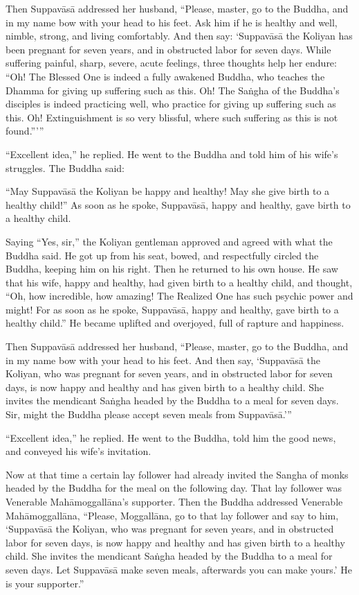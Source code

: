 \documentclass[12pt,openany]{book}%
\begin{document}
Then \textsanskrit{Suppavāsā} addressed her husband, “Please, master, go to the Buddha, and in my name bow with your head to his feet. Ask him if he is healthy and well, nimble, strong, and living comfortably. And then say: ‘\textsanskrit{Suppavāsā} the Koliyan has been pregnant for seven years, and in obstructed labor for seven days. While suffering painful, sharp, severe, acute feelings, three thoughts help her endure: “Oh! The Blessed One is indeed a fully awakened Buddha, who teaches the Dhamma for giving up suffering such as this. Oh! The \textsanskrit{Saṅgha} of the Buddha’s disciples is indeed practicing well, who practice for giving up suffering such as this. Oh! Extinguishment is so very blissful, where such suffering as this is not found.”’” 

“Excellent idea,” he replied. He went to the Buddha and told him of his wife’s struggles. The Buddha said: 

“May \textsanskrit{Suppavāsā} the Koliyan be happy and healthy! May she give birth to a healthy child!” As soon as he spoke, \textsanskrit{Suppavāsā}, happy and healthy, gave birth to a healthy child. 

Saying “Yes, sir,” the Koliyan gentleman approved and agreed with what the Buddha said. He got up from his seat, bowed, and respectfully circled the Buddha, keeping him on his right. Then he returned to his own house. He saw that his wife, happy and healthy, had given birth to a healthy child, and thought, “Oh, how incredible, how amazing! The Realized One has such psychic power and might! For as soon as he spoke, \textsanskrit{Suppavāsā}, happy and healthy, gave birth to a healthy child.” He became uplifted and overjoyed, full of rapture and happiness. 

Then \textsanskrit{Suppavāsā} addressed her husband, “Please, master, go to the Buddha, and in my name bow with your head to his feet. And then say, ‘\textsanskrit{Suppavāsā} the Koliyan, who was pregnant for seven years, and in obstructed labor for seven days, is now happy and healthy and has given birth to a healthy child. She invites the mendicant \textsanskrit{Saṅgha} headed by the Buddha to a meal for seven days. Sir, might the Buddha please accept seven meals from \textsanskrit{Suppavāsā}.’” 

“Excellent idea,” he replied. He went to the Buddha, told him the good news, and conveyed his wife’s invitation. 

Now at that time a certain lay follower had already invited the Sangha of monks headed by the Buddha for the meal on the following day. That lay follower was Venerable \textsanskrit{Mahāmoggallāna}’s supporter. Then the Buddha addressed Venerable \textsanskrit{Mahāmoggallāna}, “Please, \textsanskrit{Moggallāna}, go to that lay follower and say to him, ‘\textsanskrit{Suppavāsā} the Koliyan, who was pregnant for seven years, and in obstructed labor for seven days, is now happy and healthy and has given birth to a healthy child. She invites the mendicant \textsanskrit{Saṅgha} headed by the Buddha to a meal for seven days. Let \textsanskrit{Suppavāsā} make seven meals, afterwards you can make yours.’ He is your supporter.” 
\end{document}
